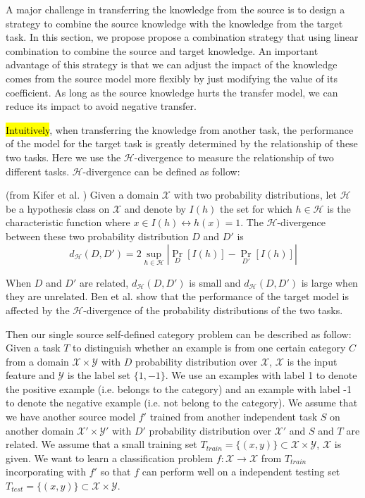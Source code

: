 A major challenge in transferring the knowledge from the source is to design a strategy to combine the source knowledge with the knowledge from the target task. In this section, we propose propose a combination strategy that using linear combination to combine the source and target knowledge. An important advantage of this strategy is that we can adjust the impact of the knowledge comes from the source model more flexibly by just modifying the value of its coefficient. As long as the source knowledge hurts the transfer model, we can reduce its impact to avoid negative transfer.

\hl{Intuitively}, when transferring the knowledge from another task, the performance of the model for the target task is greatly determined by the relationship of these two tasks. Here we use the $\mathcal{H}$-divergence to measure the relationship of two different tasks. $\mathcal{H}$-divergence can be defined as follow:
\begin{definition}
	(from Kifer et al. \cite{kifer2004detecting}) Given a domain $\mathcal{X}$ with two probability distributions, let $\mathcal{H}$ be a hypothesis class on $\mathcal{X}$ and denote by $I(h)$ the set for which $h \in \mathcal{H}$ is the characteristic function where $x\in I(h) \leftrightarrow h(x)=1$. The $\mathcal{H}$-divergence between these two probability distribution $D$ and $D'$ is 
	\begin{equation*}
	{d_{\mathcal{H}}}\left( {D,D'} \right) = 2\mathop {\sup }\limits_{h \in {\mathcal{H}}} \left| {{{\Pr }_D}\left[ {I(h)} \right] - {{\Pr }_{D'}}\left[ {I(h)} \right]} \right|
	\end{equation*}
\end{definition}
When $D$ and $D'$ are related, $d_{\mathcal{H}}\left( {D,D'} \right)$ is small and $d_{\mathcal{H}}\left( {D,D'} \right)$ is large when they are unrelated. Ben et al. \cite{ben2010theory} show that the performance of the target model is affected by the $\mathcal{H}$-divergence of the probability distributions of the two tasks. 

Then our single source self-defined category problem can be described as follow: Given a task  $T$ to distinguish whether an example is from one certain category $C$ from a domain $\mathcal{X} \times \mathcal{Y}$ with $D$ probability distribution over $\mathcal{X}$, $\mathcal{X}$ is the input feature and $\mathcal{Y}$ is the label set $\{1,-1\}$. We use an examples with label 1 to denote the positive example (i.e. belongs to the category) and an example with label -1 to denote the negative example (i.e. not belong to the category). We assume that we have another source model $f'$ trained from another independent task $S$ on another domain $\mathcal{X'} \times \mathcal{Y'}$ with $D'$ probability distribution over $\mathcal{X'}$ and $S$ and $T$ are related. We assume that a small training set $T_{train}=\{(x,y)\} \subset \mathcal{X}\times \mathcal{Y}$, $\mathcal{X}$ is given. We want to learn a classification problem $f: \mathcal{X} \rightarrow \mathcal{X}$ from $T_{train}$ incorporating with $f'$ so that $f$ can perform well on a independent testing set $T_{test}=\{(x,y)\} \subset \mathcal{X} \times \mathcal{Y}$.

